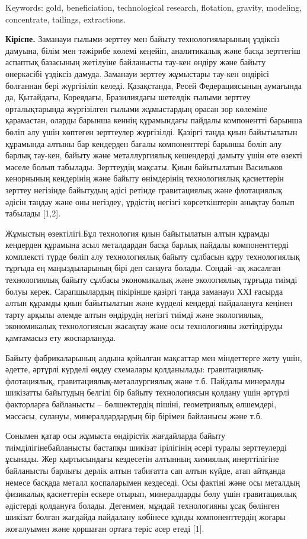 Keywords: gold, beneficiation, technological research, flotation,
gravity, modeling, concentrate, tailings, extractions.

{\bfseries Кіріспе.} Заманауи ғылыми-зерттеу мен байыту технологияларының
үздіксіз дамуына, білім мен тәжірибе көлемі кеңейіп, аналитикалық және
басқа зерттегіш аспаптық базасының жетілуіне байланысты тау-кен өндіру
және байыту өнеркәсібі үздіксіз дамуда. Заманауи зерттеу жұмыстары
тау-кен өндірісі болғаннан бері жүргізіліп келеді. Қазақстанда, Ресей
Федерациясының аумағында да, Қытайдағы, Кореядағы, Бразилиядағы шетелдік
ғылыми зерттеу орталықтарында жүргізілген ғылыми жұмыстардың орасан зор
көлеміне қарамастан, оларды барынша кеннің құрамындағы пайдалы
компонентті барынша бөліп алу үшін көптеген зерттеулер жүргізілді.
Қазіргі таңда қиын байытылатын құрамында алтыны бар кендерден бағалы
компоненттері барынша бөліп алу барлық тау-кен, байыту және
металлургиялық кешендерді дамыту үшін өте өзекті мәселе болып табылады.
Зерттеудің мақсаты. Қиын байытылатын Васильков кенорнының кендерінің
және байыту өнімдерінің технологиялық қасиеттерін зерттеу негізінде
байытудың әдісі ретінде гравитациялық және флотациялық әдісін таңдау
және оны негіздеу, үрдістің негізгі көрсеткіштерін анықтау болып
табылады {[}1,2{]}.

Жұмыстың өзектілігі.Бұл технология қиын байытылатын алтын құрамды
кендерден құрамына асыл металдардан басқа барлық пайдалы компоненттерді
комплексті түрде бөліп алу технологиялық байыту сұлбасын құру
технологиялық тұрғыда ең маңыздыларының бірі деп санауға болады. Сондай
-ақ жасалған технологиялық байыту сұлбасы экономикалық және экологиялық
тұрғыда тиімді болуы керек. Сарапшылардың пікірінше қазіргі таңда
заманауи ХХІ ғасырда алтын құрамды қиын байытылатын және күрделі
кендерді пайдалануға кеңінен тарту арқылы әлемде алтын өндірудің негізгі
тиімді және экологиялық, экономикалық технологиясын жасақтау және осы
технологияны жетілдіруды қамтамасыз ету жоспарлануда.

Байыту фабрикаларының алдына қойылған мақсаттар мен міндеттерге жету
үшін, әдетте, әртүрлі күрделі өңдеу схемалары қолданылады:
гравитациялық-флотациялық, гравитациялық-металлургиялық және т.б.
Пайдалы минералды шикізатты байытудың белгілі бір байыту технологиясын
қолдану үшін әртүрлі факторларға байланысты -- бөлшектердің пішіні,
геометриялық өлшемдері, массасы, сулануы, минералдардардың бір бірімен
байланысы және т.б.

Сонымен қатар осы жұмыста өндірістік жағдайларда байыту
тиімділігінебайланысты бастапқы шикізат ірілігінің әсері туралы
зерттеулерді ұсынады. Жер қыртысындағы кездесетін алтынның химиялық
инерттілігіне байланысты барлығы дерлік алтын табиғатта сап алтын күйде,
атап айтқанда немесе басқада металл қоспаларымен кездеседі. Осы фактіні
және осы металдың физикалық қасиеттерін ескере отырып, минералдарды бөлу
үшін гравитациялық әдістерді қолдануға болады. Дегенмен, мұндай
технологияны ұсақ бөлінген шикізат болған жағдайда пайдалану көбінесе
құнды компоненттердің жоғары жоғалуымен және қоршаған ортаға теріс әсер
етеді {[}1{]}.

